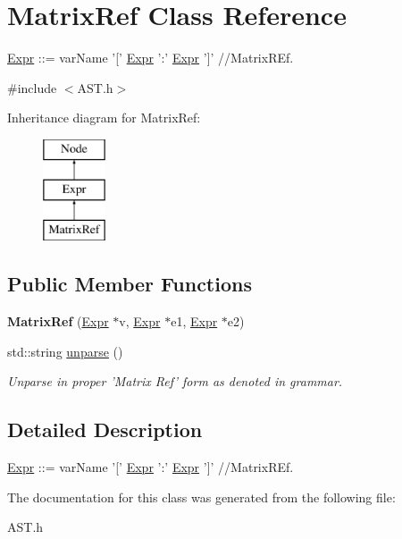 \hypertarget{classMatrixRef}{\section{Matrix\-Ref Class Reference}
\label{classMatrixRef}
}


\hyperlink{classExpr}{Expr} \-:\-:= var\-Name '\mbox{[}' \hyperlink{classExpr}{Expr} '\-:' \hyperlink{classExpr}{Expr} '\mbox{]}' //\-Matrix\-R\-Ef.  




{\ttfamily \#include $<$A\-S\-T.\-h$>$}

Inheritance diagram for Matrix\-Ref\-:\begin{figure}[H]
\begin{center}
\leavevmode
\includegraphics[height=3.000000cm]{classMatrixRef}
\end{center}
\end{figure}
\subsection*{Public Member Functions}
\begin{DoxyCompactItemize}
\item 
\hypertarget{classMatrixRef_a369a1da63af501e2dfe6c62c54f5dd28}{{\bfseries Matrix\-Ref} (\hyperlink{classExpr}{Expr} $\ast$v, \hyperlink{classExpr}{Expr} $\ast$e1, \hyperlink{classExpr}{Expr} $\ast$e2)}\label{classMatrixRef_a369a1da63af501e2dfe6c62c54f5dd28}

\item 
\hypertarget{classMatrixRef_aedf083a71a74fec22264aa71fdedb5e6}{std\-::string \hyperlink{classMatrixRef_aedf083a71a74fec22264aa71fdedb5e6}{unparse} ()}\label{classMatrixRef_aedf083a71a74fec22264aa71fdedb5e6}

\begin{DoxyCompactList}\small\item\em Unparse in proper 'Matrix Ref' form as denoted in grammar. \end{DoxyCompactList}\end{DoxyCompactItemize}


\subsection{Detailed Description}
\hyperlink{classExpr}{Expr} \-:\-:= var\-Name '\mbox{[}' \hyperlink{classExpr}{Expr} '\-:' \hyperlink{classExpr}{Expr} '\mbox{]}' //\-Matrix\-R\-Ef. 

The documentation for this class was generated from the following file\-:\begin{DoxyCompactItemize}
\item 
A\-S\-T.\-h\end{DoxyCompactItemize}
